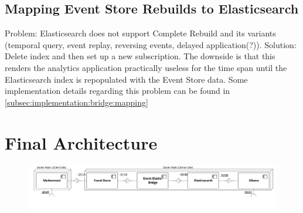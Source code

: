 \subsection{Mapping Event Store Rebuilds to Elasticsearch}
\label{subsec:design:bridge:mapping}

Problem: Elasticsearch does not support Complete Rebuild and its variants (temporal query, event replay, reversing events, delayed application(?)).
Solution: Delete index and then set up a new subscription.
The downside is that this renders the analytics application practically useless for the time span until the Elasticsearch index is repopulated with the Event Store data.
Some implementation details regarding this problem can be found in \cref{subsec:implementation:bridge:mapping}

\section{Final Architecture}

\begin{figure}[htb]
        \includegraphics[width=\textwidth]{gfx/docker-architecture}
        \caption{}
        \label{}
\end{figure}





































